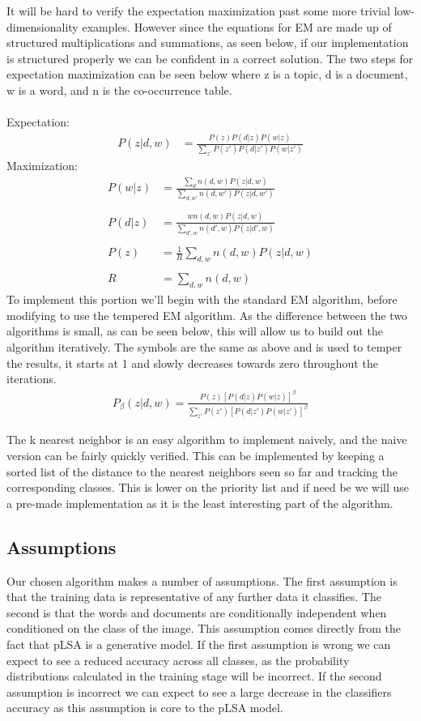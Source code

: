 \documentclass[conference]{IEEEtran}
\begin{document}
It will be hard to verify the expectation maximization past some more trivial low-dimensionality examples. However since the equations for EM are made up of structured multiplications and summations, as seen below, if our implementation is structured properly we can be confident in a correct solution. The two steps for expectation maximization can be seen below where z is a topic, d is a document, w is a word, and n is the co-occurrence table.\\\\
Expectation:
\begin{align*}
P(z|d, w) &= \frac{P(z)P(d|z)P(w|z)}{\sum_{z'} P(z')P(d|z')P(w|z')}
\end{align*}
Maximization:
\begin{align*}
P(w|z) &= \frac{\sum_{d} n(d,w)P(z|d,w)}{\sum_{d, w'} n(d,w')P(z|d,w')}\\\\
P(d|z) &= \frac{w n(d,w)P(z|d,w)}{\sum_{d', w} n(d',w)P(z|d',w)}\\\\
P(z) &= \frac{1}{R}\sum_{d, w} n(d,w)P(z|d,w)\\\\
R &= \sum_{d, w} n(d,w)
\end{align*}
 To implement this portion we’ll begin with the standard EM algorithm, before modifying to use the tempered EM algorithm. As the difference between the two algorithms is small, as can be seen below, this will allow us to build out the algorithm iteratively. The symbols are the same as above and  is used to temper the results, it starts at 1 and slowly decreases towards zero throughout the iterations.\\
\begin{align*}
P_\beta(z|d, w) = \frac{P(z)[P(d|z)P(w|z)]^\beta}{\sum_{z'}P(z')[P(d|z')P(w|z')]^\beta}
\end{align*}


The k nearest neighbor is an easy algorithm to implement naively, and the naive version can be fairly quickly verified. This can be implemented by keeping a sorted list of the distance to the nearest neighbors seen so far and tracking the corresponding classes. This is lower on the priority list and if need be we will use a pre-made implementation as it is the least interesting part of the algorithm.

\subsection{Assumptions}
Our chosen algorithm makes a number of assumptions. The first assumption is that the training data is representative of any further data it classifies. The second is that the words and documents are conditionally independent when conditioned on the class of the image. This assumption comes directly from the fact that pLSA is a generative model. If the first assumption is wrong we can expect to see a reduced accuracy across all classes, as the probability distributions calculated in the training stage will be incorrect. If the second assumption is incorrect we can expect to see a large decrease in the classifiers accuracy as this assumption is core to the pLSA model. 
\end{document}
